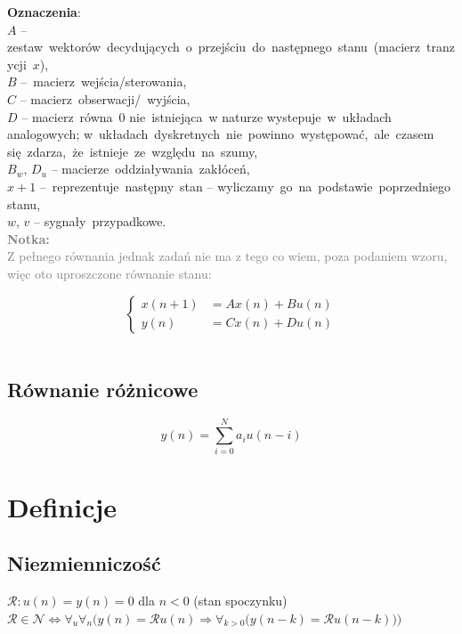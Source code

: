 \documentclass[12pt]{scrartcl}
\newcommand{\fancy}[1]{\mathcal{#1}}
\newcommand{\notka}[1]{
	\textcolor{gray}{\textbf{Notka:\\\indent} #1}
}
\begin{document}
	\textbf{Oznaczenia}:\\
	$A$ -- zestaw wektorów decydujących o przejściu do następnego stanu (macierz tranzycji $x$),
	\\$B$ -- macierz wejścia/sterowania,
	\\$C$ -- macierz obserwacji/ wyjścia,
	\\$D$ -- macierz równa 0 nie istniejąca w naturze wystepuje w układach 
	analogowych; w układach dyskretnych nie powinno występować, ale czasem 
	się zdarza, że istnieje ze względu na szumy,
	\\$B_w$, $D_u$ -- macierze oddziaływania zakłóceń,
	\\$x+1$ -- reprezentuje następny stan -- wyliczamy go na podstawie poprzedniego stanu,
	\\$w$, $v$ -- sygnały przypadkowe. 
	\\
\notka{
	Z pełnego równania jednak zadań nie ma z tego co wiem, poza podaniem wzoru, więc oto uproszczone równanie stanu:\\
}
	\label{eq:rownanie_stanu_uproszczone}
	\begin{equation}
		\begin{cases}
			x(n+1) &= Ax(n) + Bu(n)\\
			y(n) &= Cx(n) + Du(n)
		\end{cases}
	\end{equation}\\

\subsection{Równanie różnicowe}\label{eq:rownanie_roznicowe}
	\begin{equation}
		y(n) = \sum\limits_{i=0}^{N}a_iu(n-i)
	\end{equation}




\section{Definicje}
	\subsection{Niezmienniczość}\label{sec:niezmienniczosc}
	
	$\fancy{R}: u(n)=y(n)=0 $ dla $ n<0 $ (stan spoczynku)\\
	$\fancy{R} \in \fancy{N} \Leftrightarrow
	\forall_u\forall_n \Big( y(n)=\fancy{R}u(n) \Rightarrow \forall_{k>0} \big( y(n-k)=\fancy{R}u(n-k)\big) \Big)$\\
	
\end{document}
